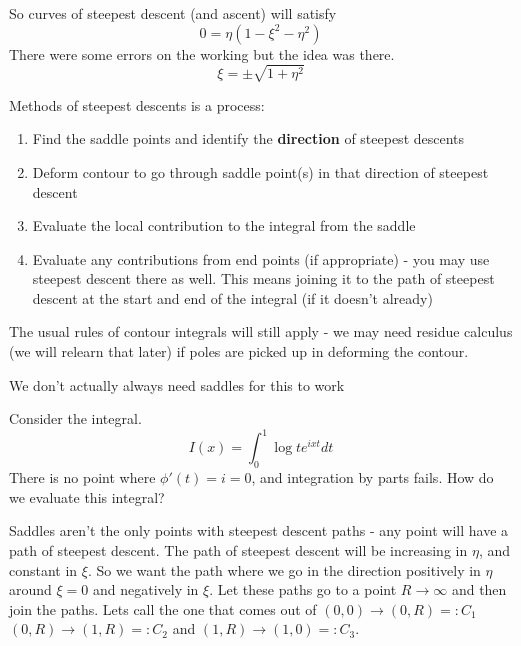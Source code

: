 \documentclass{X:/Documents/Coding/Latex/myassignment}
\begin{document}
So curves of steepest descent (and ascent) will satisfy 
\[0 = \eta(1-\xi^2 -\eta^2)\]
There were some errors on the working but the idea was there.
\[\xi  =\pm \sqrt{1 + \eta^2} \]



Methods of steepest descents is a process:
\begin{enumerate}
    \item Find the saddle points and identify the \textbf{direction} of steepest descents
    \item Deform contour to go through saddle point(s) in that direction of steepest descent
    \item Evaluate the local contribution to the integral from the saddle
    \item Evaluate any contributions from end points (if appropriate) - you may use steepest descent there as well. This means joining it to the path of steepest descent at the start and end of the integral (if it doesn't already)
\end{enumerate}
The usual rules of contour integrals will still apply - we may need residue calculus (we will relearn that later) if poles are picked up in deforming the contour.

We don't actually always need saddles for this to work

Consider the integral.
\[I(x) = \int_0^1 \log t e^{ixt} dt\]
There is no point where $\phi'(t) = i = 0$, and integration by parts fails. How do we evaluate this integral?

Saddles aren't the only points with steepest descent paths - any point will have a path of steepest descent. 
The path of steepest descent will be increasing in $\eta$, and constant in $\xi$. So we want the path where we go in the direction positively in $\eta$ around $\xi =0$ and negatively in $\xi$. Let these paths go to a point $R\to \infty$ and then join the paths. 
Lets call the one that comes out of $(0,0) \to (0,R) =: C_1$ $(0,R)\to(1,R) =: C_2$ and $(1,R) \to (1,0) = : C_3$.
\end{document}
